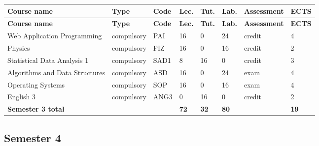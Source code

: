 \documentclass[12pt,a4paper]{article}
\newcommand{\thdrule}{\noalign{\global\setlength{\extrarowheight}{0pt}}}
\newcommand{\thdend}{\noalign{\global\setlength{\extrarowheight}{4pt}}}
\begin{document}
{\scriptsize
\begin{longtable}{m{5.0cm}m{1.9cm}m{0.75cm}m{0.85cm}m{0.85cm}m{0.85cm}m{1.45cm}m{0.9cm}}
\thdrule\toprule
\rowcolor{pjatkRed}
{\color{white}\footnotesize\textbf{\vphantom{Ag}Course name}} & {\color{white}\footnotesize\textbf{\vphantom{Ag}Type}} & {\color{white}\footnotesize\textbf{\vphantom{Ag}Code}} & {\color{white}\footnotesize\textbf{\vphantom{Ag}Lec.}} & {\color{white}\footnotesize\textbf{\vphantom{Ag}Tut.}} & {\color{white}\footnotesize\textbf{\vphantom{Ag}Lab.}} & {\color{white}\footnotesize\textbf{\vphantom{Ag}Assessment}} & {\color{white}\footnotesize\textbf{\vphantom{Ag}ECTS}} \\
\midrule\thdend
\endfirsthead
\thdrule\toprule
\rowcolor{pjatkRed}
{\color{white}\footnotesize\textbf{\vphantom{Ag}Course name}} & {\color{white}\footnotesize\textbf{\vphantom{Ag}Type}} & {\color{white}\footnotesize\textbf{\vphantom{Ag}Code}} & {\color{white}\footnotesize\textbf{\vphantom{Ag}Lec.}} & {\color{white}\footnotesize\textbf{\vphantom{Ag}Tut.}} & {\color{white}\footnotesize\textbf{\vphantom{Ag}Lab.}} & {\color{white}\footnotesize\textbf{\vphantom{Ag}Assessment}} & {\color{white}\footnotesize\textbf{\vphantom{Ag}ECTS}} \\
\midrule\thdend
\endhead
\rowcolor{tableRowLight} Web Application Programming & {\scriptsize compulsory} & PAI & 16 & 0 & 24 & {\scriptsize credit} & 4 \\
\rowcolor{tableRowAlt} Physics & {\scriptsize compulsory} & FIZ & 16 & 0 & 16 & {\scriptsize credit} & 2 \\
\rowcolor{tableRowLight} Statistical Data Analysis 1 & {\scriptsize compulsory} & SAD1 & 8 & 16 & 0 & {\scriptsize credit} & 3 \\
\rowcolor{tableRowAlt} Algorithms and Data Structures & {\scriptsize compulsory} & ASD & 16 & 0 & 24 & {\scriptsize exam} & 4 \\
\rowcolor{tableRowLight} Operating Systems & {\scriptsize compulsory} & SOP & 16 & 0 & 16 & {\scriptsize exam} & 4 \\
\rowcolor{tableRowAlt} English 3 & {\scriptsize compulsory} & ANG3 & 0 & 16 & 0 & {\scriptsize credit} & 2 \\
\midrule[\heavyrulewidth]
\rowcolor{tableSummary} \textbf{Semester 3 total} & & & \textbf{72} & \textbf{32} & \textbf{80} & & \textbf{19} \\
\bottomrule
\end{longtable}}

\subsection*{Semester 4}
\end{document}
